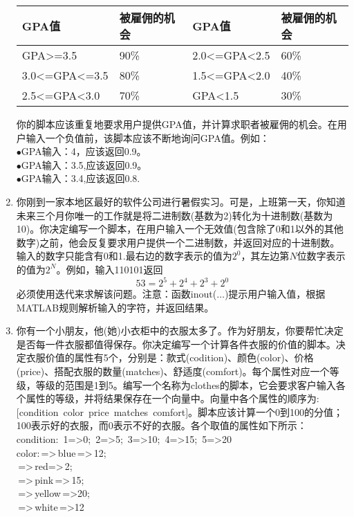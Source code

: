 \documentclass[UTF8]{ctexart}
\begin{document}
\begin{enumerate}
\begin{table}[H]
		\begin{center}
		\begin{tabularx}{12cm}{l|l||l|l}
			\hline
			GPA值&被雇佣的机会&GPA值&被雇佣的机会\\ \hline
			GPA>=3.5&90\%&2.0<=GPA<2.5&60\%\\ \hline
			3.0<=GPA<=3.5&80\%&1.5<=GPA<2.0&40\%\\ \hline
			2.5<=GPA<3.0&70\%&GPA<1.5&30\%\\
			\hline
		\end{tabularx}
		\end{center}	
	\end{table}
	你的脚本应该重复地要求用户提供GPA值，并计算求职者被雇佣的机会。在用户输入一个负值前，该脚本应该不断地询问GPA值。例如：\\
	$\bullet$GPA输入：4，应该返回0.9。\\
	$\bullet$GPA输入：3.5,应该返回0.9。\\
	$\bullet$GPA输入：3.4,应该返回0.8.
	\item 你刚到一家本地区最好的软件公司进行暑假实习。可是，上班第一天，你知道未来三个月你唯一的工作就是将二进制数(基数为2)转化为十进制数(基数为10)。你决定编写一个脚本，在用户输入一个无效值(包含除了0和1以外的其他数字)之前，他会反复要求用户提供一个二进制数，并返回对应的十进制数。输入的数字只能含有0和1.最右边的数字表示的值为$2^{0}$，其左边第$N$位数字表示的值为$2^{N}$。例如，输入110101返回$$ 53= 2^{5}+2^{4}+2^{3}+2^{0}$$
	必须使用迭代来求解该问题。注意：函数inout($\dots$)提示用户输入值，根据MATLAB规则解析输入的字符，并返回结果。
	\item 你有一个小朋友，他(她)小衣柜中的衣服太多了。作为好朋友，你要帮忙决定是否每一件衣服都值得保存。你决定编写一个计算各件衣服的价值的脚本。决定衣服价值的属性有5个，分别是：款式(codition)、颜色(color)、价格(price)、搭配衣服的数量(matches)、舒适度(comfort)。每个属性对应一个等级，等级的范围是1到5。编写一个名称为clothes的脚本，它会要求客户输入各个属性的等级，并将结果保存在一个向量中。向量中各个属性的顺序为:[condition\ color\ price\ matches\ comfort]。脚本应该计算一个0到100的分值；100表示好的衣服，而0表示不好的衣服。各个取值的属性如下所示：\\
	condition:\ 1=>0;\ 2=>5;\ 3=>10;\ 4=>15;\ 5=>20\\
	color:\,=>\,blue\,=>\,12;\\
	\,=>\,red=>\,2;\\
	\,=>\,pink\,=>\,15;\\
	\,=>\,yellow\,=>20;\\
	\,=>\,white\,=>12\\

\end{enumerate}
\end{document}
